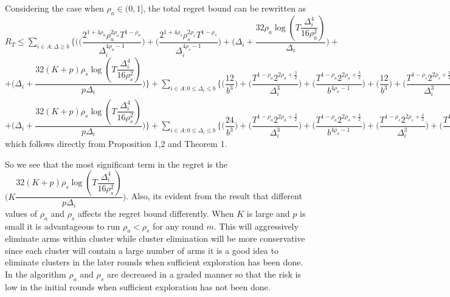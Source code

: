 \begin{remark}
Considering the case when $\rho_{a}\in (0,1]$, the total regret bound can be rewritten as $R_{T}\leq \sum_{i\in A:\Delta\geq b} \bigg\lbrace \bigg(\bigg(\dfrac{2^{1+4\rho_{a}}\rho_{a}^{2\rho_{a}}T^{1-\rho_{a}}}{\Delta_{i}^{4\rho_{a}-1}}\bigg) + \bigg(\dfrac{2^{1+4\rho_{s}}\rho_{s}^{2\rho_{s}}T^{1-\rho_{s}}}{\Delta_{i}^{4\rho_{s}-1}}\bigg) + \bigg(\Delta_{i}+\dfrac{32\rho_{a}\log{(T\dfrac{\Delta_{i}^{4}}{16\rho_{a}^{2}})}}{\Delta_{i}}\bigg) +$ \newline $ + \bigg(\Delta_{i}+\dfrac{32(K+p)\rho_{s}\log{(T\dfrac{\Delta_{i}^{4}}{16\rho_{s}^{2}})}}{p\Delta_{i}}\bigg)\bigg\rbrace + \sum_{i\in A:0\leq\Delta_{i}\leq b}\bigg\lbrace \bigg(\dfrac{12}{b^{3}} \bigg) + \bigg(\dfrac{T^{1-\rho_{a}}2^{2\rho_{a}+\frac{3}{2}}}{\Delta_{i}^{3}} \bigg)+\bigg(\dfrac{T^{1-\rho_{a}}2^{2\rho_{a}+\frac{3}{2}}}{b^{4\rho_{a} -1}} \bigg) + \bigg(\dfrac{12}{b^{3}} \bigg) + \bigg(\dfrac{T^{1-\rho_{s}}2^{2\rho_{s}+\frac{3}{2}}}{\Delta_{i}^{3}} \bigg)+\bigg(\dfrac{T^{1-\rho_{s}}2^{2\rho_{s}+\frac{3}{2}}}{b^{4\rho_{s} -1}} \bigg) \bigg\rbrace + max_{i:\Delta\leq b}\Delta_{i}T   =    \sum_{i\in A:\Delta\geq b} \bigg\lbrace \bigg(\bigg(\dfrac{2^{1+4\rho_{a}}\rho_{a}^{2\rho_{a}}T^{1-\rho_{a}}}{\Delta_{i}^{4\rho_{a}-1}}\bigg) + \bigg(\dfrac{2^{1+4\rho_{s}}\rho_{s}^{2\rho_{s}}T^{1-\rho_{s}}}{\Delta_{i}^{4\rho_{s}-1}}\bigg) + \bigg(\Delta_{i}+\dfrac{32\rho_{a}\log{(T\dfrac{\Delta_{i}^{4}}{16\rho_{a}^{2}})}}{\Delta_{i}}\bigg) +$ \newline $ + \bigg(\Delta_{i}+\dfrac{32(K+p)\rho_{s}\log{(T\dfrac{\Delta_{i}^{4}}{16\rho_{s}^{2}})}}{p\Delta_{i}}\bigg)\bigg\rbrace + \sum_{i\in A:0\leq\Delta_{i}\leq b}\bigg\lbrace \bigg(\dfrac{24}{b^{3}} \bigg) + \bigg(\dfrac{T^{1-\rho_{a}}2^{2\rho_{a}+\frac{3}{2}}}{\Delta_{i}^{3}} \bigg)+\bigg(\dfrac{T^{1-\rho_{a}}2^{2\rho_{a}+\frac{3}{2}}}{b^{4\rho_{a} -1}} \bigg) + \bigg(\dfrac{T^{1-\rho_{s}}2^{2\rho_{s}+\frac{3}{2}}}{\Delta_{i}^{3}} \bigg)+\bigg(\dfrac{T^{1-\rho_{s}}2^{2\rho_{s}+\frac{3}{2}}}{b^{4\rho_{s} -1}} \bigg) \bigg\rbrace + max_{i:\Delta\leq b}\Delta_{i}T $ which follows directly from Proposition 1,2 and Theorem 1.

	So we see that the most significant term in the regret is the $\bigg(K\dfrac{32(K+p)\rho_{s}\log{(T\dfrac{\Delta_{i}^{4}}{16\rho_{s}^{2}})}}{p\Delta_{i}}\bigg)$. Also, its evident from the result that different values of $\rho_{a}$ and $\rho_{s}$ affects the regret bound differently. When $K$ is large and $p$ is small it is advantageous to run $\rho_{a}< \rho_{s}$ for any round $m$. This will aggressively eliminate arms within cluster while cluster elimination will be more conservative since each cluster will contain a large number of arms it is a good idea to eliminate clusters in the later rounds when sufficient exploration has been done. In the algorithm $\rho_{a}$ and $\rho_{s}$ are decreased in a graded manner so that the risk is low in the initial rounds when sufficient exploration has not been done.
	
\end{remark}


